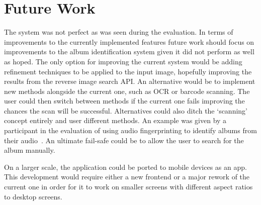 \section{Future Work}
The system was not perfect as was seen during the evaluation. In terms of improvements to the currently implemented features future work should focus on improvements to the album identification system given it did not perform as well as hoped. The only option for improving the current system would be adding refinement techniques to be applied to the input image, hopefully improving the results from the reverse image search API. An alternative would be to implement new methods alongside the current one, such as OCR or barcode scanning. The user could then switch between methods if the current one fails improving the chances the scan will be successful.
Alternatives could also ditch the `scanning' concept entirely and user different methods. An example was given by a participant in the evaluation of using audio fingerprinting to identify albums from their audio~\cite{Cano2005}. An ultimate fail-safe could be to allow the user to search for the album manually.

On a larger scale, the application could be ported to mobile devices as an app. This development would require either a new frontend or a major rework of the current one in order for it to work on smaller screens with different aspect ratios to desktop screens.
